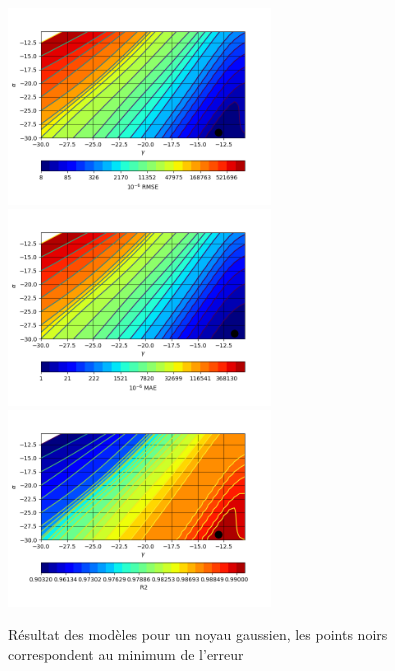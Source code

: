 \documentclass[a4paper,12pt,titlepage]{report}
\begin{document}
	\begin{figure}[!h]	
		\begin{center}
		\includegraphics[height = 5.2cm, keepaspectratio]{graphes/resultat_RBF_RMSE.png}
		\includegraphics[height = 5.2cm, keepaspectratio]{graphes/resultat_RBF_MAE.png}
		\includegraphics[height = 5.2cm, keepaspectratio]{graphes/resultat_RBF_R2.png}
	\caption{Résultat des modèles pour un noyau gaussien, les points noirs correspondent au minimum de l'erreur}
		\end{center}
	\end{figure}
\end{document}
